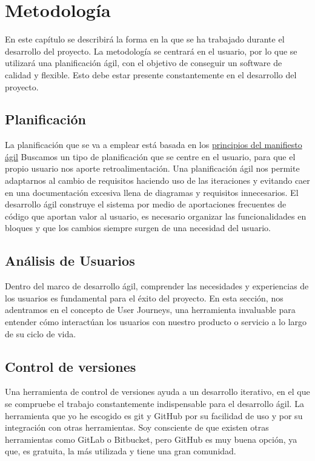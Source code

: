 \UseRawInputEncoding
\chapter{Metodología}
En este capítulo se describirá la forma en la que se ha trabajado durante el desarrollo del proyecto.
La metodología se centrará en el usuario, por lo que se utilizará una planificación ágil, con el objetivo
de conseguir un software de calidad y flexible. Esto debe estar presente constantemente en el desarrollo del proyecto.

\section{Planificación}
La planificación que se va a emplear está basada en los {\href{https://agilemanifesto.org/iso/es/principles.html}{principios del manifiesto ágil}}
Buscamos un tipo de planificación que se centre en el usuario, para que el propio usuario nos aporte retroalimentación.
Una planificación ágil nos permite adaptarnos al cambio de requisitos haciendo uso de las iteraciones y
evitando caer en una documentación excesiva llena de diagramas y requisitos innecesarios.
El desarrollo ágil construye el sistema por medio de aportaciones frecuentes de código que aportan valor
al usuario, es necesario organizar las funcionalidades en bloques y que los cambios siempre surgen de una
necesidad del usuario.

\section{Análisis de Usuarios}
Dentro del marco de desarrollo ágil, comprender las necesidades y experiencias de los usuarios es fundamental para el éxito del proyecto.
En esta sección, nos adentramos en el concepto de User Journeys, una herramienta invaluable para entender cómo interactúan los usuarios con nuestro producto o servicio a lo largo de su ciclo de vida.



\section{Control de versiones}
Una herramienta de control de versiones ayuda a un desarrollo iterativo, en el que se compruebe el trabajo constantemente indispensable para el desarrollo ágil.
La herramienta que yo he escogido es git y GitHub por su facilidad de uso y por su integración con otras herramientas.
Soy consciente de que existen otras herramientas como GitLab o Bitbucket, pero GitHub es muy buena opción, ya que, es gratuita, la más utilizada y tiene una gran comunidad.

